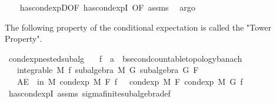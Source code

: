 \begin{isabellebody}
%
\isadelimproof
\ \ %
\endisadelimproof
%
\isatagproof
{}\isamarkupfalse%
\ has{\isacharunderscore}{\kern0pt}cond{\isacharunderscore}{\kern0pt}expD{\isacharparenleft}{\kern0pt}{}{\isacharparenright}{\kern0pt}{\isacharbrackleft}{\kern0pt}OF\ has{\isacharunderscore}{\kern0pt}cond{\isacharunderscore}{\kern0pt}expI{\isacharcomma}{\kern0pt}\ OF\ assms{\isacharbrackright}{\kern0pt}\ \isamarkupfalse%
\ argo%
\endisatagproof
{\isafoldproof}%
%
\isadelimproof
%
\endisadelimproof
%
\begin{isamarkuptext}%
The following property of the conditional expectation is called the "Tower Property".%
\end{isamarkuptext}\isamarkuptrue%
\isamarkupfalse%
\ cond{\isacharunderscore}{\kern0pt}exp{\isacharunderscore}{\kern0pt}nested{\isacharunderscore}{\kern0pt}subalg{\isacharcolon}{\kern0pt}\isanewline
\ \ \ f\ {\isacharcolon}{\kern0pt}{\isacharcolon}{\kern0pt}\ {\isachardoublequoteopen}{\isacharprime}{\kern0pt}a\ {\isasymRightarrow}\ {\isacharprime}{\kern0pt}b{\isacharcolon}{\kern0pt}{\isacharcolon}{\kern0pt}{\isacharbraceleft}{\kern0pt}second{\isacharunderscore}{\kern0pt}countable{\isacharunderscore}{\kern0pt}topology{\isacharcomma}{\kern0pt}banach{\isacharbraceright}{\kern0pt}{\isachardoublequoteclose}\isanewline
\ \ \ {\isachardoublequoteopen}integrable\ M\ f{\isachardoublequoteclose}\ {\isachardoublequoteopen}subalgebra\ M\ G{\isachardoublequoteclose}\ {\isachardoublequoteopen}subalgebra\ G\ F{\isachardoublequoteclose}\isanewline
\ \ \ {\isachardoublequoteopen}AE\ {\isasymxi}\ in\ M{\isachardot}{\kern0pt}\ cond{\isacharunderscore}{\kern0pt}exp\ M\ F\ f\ {\isasymxi}\ {\isacharequal}{\kern0pt}\ cond{\isacharunderscore}{\kern0pt}exp\ M\ F\ {\isacharparenleft}{\kern0pt}cond{\isacharunderscore}{\kern0pt}exp\ M\ G\ f{\isacharparenright}{\kern0pt}\ {\isasymxi}{\isachardoublequoteclose}\isanewline
%
\isadelimproof
\ \ %
\endisadelimproof
%
\isatagproof
{}\isamarkupfalse%
\ has{\isacharunderscore}{\kern0pt}cond{\isacharunderscore}{\kern0pt}expI\ assms\ sigma{\isacharunderscore}{\kern0pt}finite{\isacharunderscore}{\kern0pt}subalgebra{\isacharunderscore}{\kern0pt}def\ \isamarkupfalse%

\end{isabellebody}
